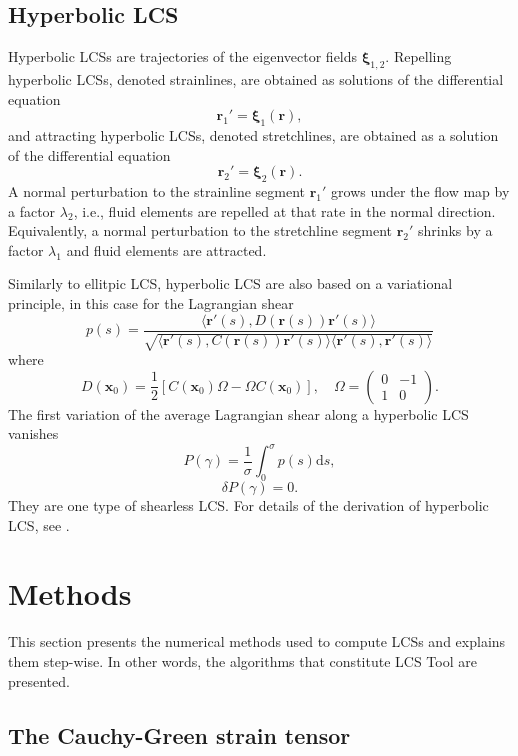\documentclass{article}
\begin{document}
\subsection{Hyperbolic LCS}
Hyperbolic LCSs are trajectories of the eigenvector fields $\boldsymbol \xi_{1,2}$. Repelling hyperbolic LCSs, denoted strainlines, are obtained as solutions of the differential equation
\begin{equation}
\boldsymbol r_1' = \boldsymbol \xi_1(\boldsymbol r),
\label{eq:strainline}
\end{equation}
and attracting hyperbolic LCSs, denoted stretchlines, are obtained as a solution of the differential equation
\[
\boldsymbol r_2' = \boldsymbol \xi_2(\boldsymbol r).
\]
A normal perturbation to the strainline segment $\boldsymbol r_1'$ grows under the flow map by a factor $\lambda_2$, i.e., fluid elements are repelled at that rate in the normal direction. Equivalently, a normal perturbation to the stretchline segment $\boldsymbol r_2'$ shrinks by a factor $\lambda_1$ and fluid elements are attracted.

Similarly to ellitpic LCS, hyperbolic LCS are also based on a variational principle, in this case for the Lagrangian shear
\[
p(s) = \frac{\langle \boldsymbol r'(s), D(\boldsymbol r(s)) \boldsymbol r'(s)\rangle}{\sqrt{\langle \boldsymbol r'(s), C(\boldsymbol r(s)) \boldsymbol r'(s)\rangle \langle \boldsymbol r'(s), \boldsymbol r'(s)\rangle}}
\]
where
\[
D(\boldsymbol x_0) = \frac12[C(\boldsymbol x_0) \Omega - \Omega C(\boldsymbol x_0)], \quad \Omega = \begin{pmatrix}0&-1\\1&0\end{pmatrix}.
\]
The first variation of the average Lagrangian shear along a hyperbolic LCS vanishes
\[
P(\gamma) = \frac{1}{\sigma} \int_0^\sigma p(s) \text{d}s,
\]
\[
\delta P(\gamma) = 0.
\]
They are one type of shearless LCS. For details of the derivation of hyperbolic LCS, see \cite{farazmand13:_shearless}.

\clearpage

\section{Methods}

This section presents the numerical methods used to compute LCSs and explains them step-wise. In other words, the algorithms that constitute LCS Tool are presented.

\subsection{The Cauchy-Green strain tensor}
\end{document}
